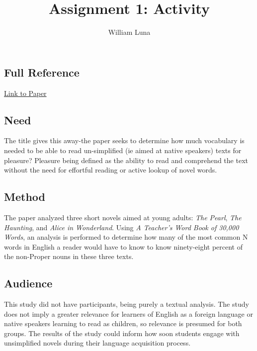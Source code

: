 \documentclass[
	letterpaper, %
]{jdf}
\author{William Luna}
\title{Assignment 1: Activity}
\begin{document}

\maketitle
\section{\cite{nation1992vocabulary}}
\subsection{Full Reference}

\href{https://scholarspace.manoa.hawaii.edu/server/api/core/bitstreams/04d7edf5-be1c-4a1e-9c91-995135ac4120/content}{Link to Paper}

\subsection{Need}
The title gives this away-the paper seeks to determine how much vocabulary is needed to be able to read un-simplified (ie aimed at native speakers) texts for pleasure? Pleasure being defined as the ability to read and comprehend the text without the need for effortful reading or active lookup of novel words.

\subsection{Method}
The paper analyzed three short novels aimed at young adults: \textit{The Pearl}, \textit{The Haunting}, and \textit{Alice in Wonderland}. Using \textit{A Teacher's Word Book of 30,000 Words}, an analysis is performed to determine how many of the most common N words in English a reader would have to know to know ninety-eight percent of the non-Proper nouns in these three texts.

\subsection{Audience}
This study did not have participants, being purely a textual analysis. The study does not imply a greater relevance for learners of English as a foreign language or native speakers learning to read as children, so relevance is presumed for both groups. The results of the study could inform how soon students engage with unsimplified novels during their language acquisition process.
\end{document}
